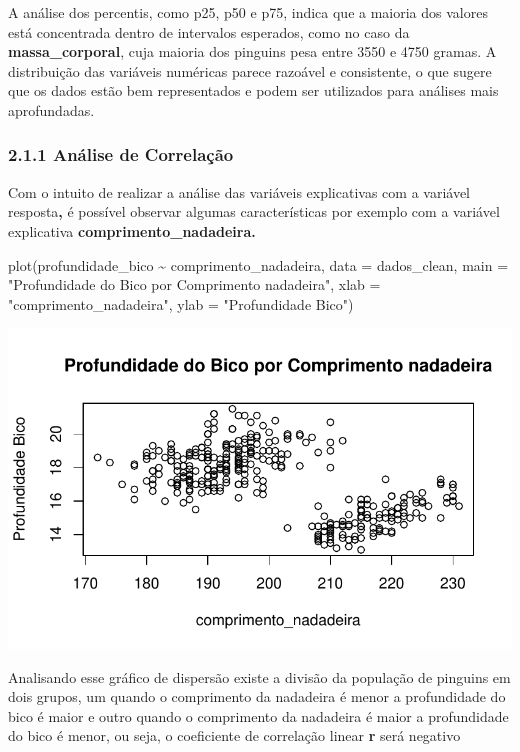 \documentclass[
  letterpaper,
  DIV=11,
  numbers=noendperiod]{scrartcl}
\newenvironment{Shaded}{\begin{snugshade}}{\end{snugshade}}
\newcommand{\AttributeTok}[1]{\textcolor[rgb]{0.40,0.45,0.13}{#1}}
\newcommand{\FunctionTok}[1]{\textcolor[rgb]{0.28,0.35,0.67}{#1}}
\newcommand{\NormalTok}[1]{\textcolor[rgb]{0.00,0.23,0.31}{#1}}
\newcommand{\SpecialCharTok}[1]{\textcolor[rgb]{0.37,0.37,0.37}{#1}}
\newcommand{\StringTok}[1]{\textcolor[rgb]{0.13,0.47,0.30}{#1}}
\begin{document}
A análise dos percentis, como p25, p50 e p75, indica que a maioria dos
valores está concentrada dentro de intervalos esperados, como no caso da
\textbf{massa\_corporal}, cuja maioria dos pinguins pesa entre 3550 e
4750 gramas. A distribuição das variáveis numéricas parece razoável e
consistente, o que sugere que os dados estão bem representados e podem
ser utilizados para análises mais aprofundadas.

\subsubsection{2.1.1 Análise de
Correlação}\label{anuxe1lise-de-correlauxe7uxe3o}

Com o intuito de realizar a análise das variáveis explicativas com a
variável resposta\textbf{,} é possível observar algumas características
por exemplo com a variável explicativa \textbf{comprimento\_nadadeira.}

\begin{Shaded}
\begin{Highlighting}[]
\FunctionTok{plot}\NormalTok{(profundidade\_bico }\SpecialCharTok{\textasciitilde{}}\NormalTok{ comprimento\_nadadeira, }\AttributeTok{data =}\NormalTok{ dados\_clean, }
        \AttributeTok{main =} \StringTok{"Profundidade do Bico por Comprimento nadadeira"}\NormalTok{,}
        \AttributeTok{xlab =} \StringTok{"comprimento\_nadadeira"}\NormalTok{, }\AttributeTok{ylab =} \StringTok{"Profundidade Bico"}\NormalTok{)}
\end{Highlighting}
\end{Shaded}

\includegraphics{r_files/figure-pdf/unnamed-chunk-2-1.pdf}

Analisando esse gráfico de dispersão existe a divisão da população de
pinguins em dois grupos, um quando o comprimento da nadadeira é menor a
profundidade do bico é maior e outro quando o comprimento da nadadeira é
maior a profundidade do bico é menor, ou seja, o coeficiente de
correlação linear \textbf{r} será negativo
\end{document}
